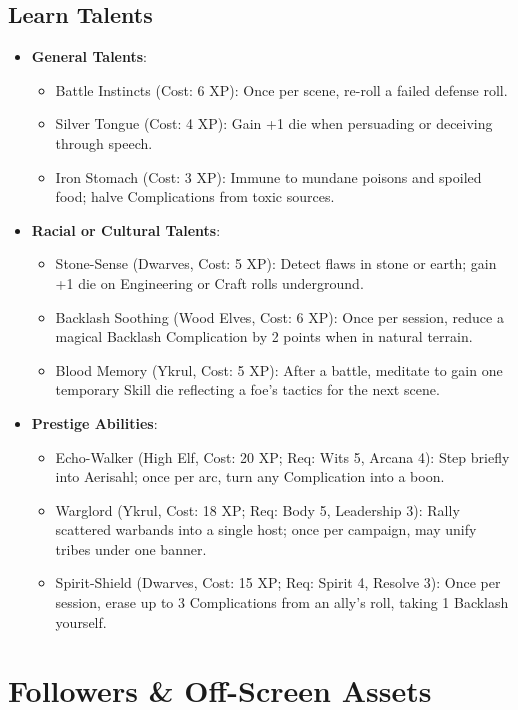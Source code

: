 \documentclass[11pt]{article}
\begin{document}
\subsection{Learn Talents}
\begin{itemize}
    \item \textbf{General Talents}:
    \begin{itemize}
        \item Battle Instincts (Cost: 6 XP): Once per scene, re-roll a failed defense roll.
        \item Silver Tongue (Cost: 4 XP): Gain +1 die when persuading or deceiving through speech.
        \item Iron Stomach (Cost: 3 XP): Immune to mundane poisons and spoiled food; halve Complications from toxic sources.
    \end{itemize}
    \item \textbf{Racial or Cultural Talents}:
    \begin{itemize}
        \item Stone-Sense (Dwarves, Cost: 5 XP): Detect flaws in stone or earth; gain +1 die on Engineering or Craft rolls underground.
        \item Backlash Soothing (Wood Elves, Cost: 6 XP): Once per session, reduce a magical Backlash Complication by 2 points when in natural terrain.
        \item Blood Memory (Ykrul, Cost: 5 XP): After a battle, meditate to gain one temporary Skill die reflecting a foe's tactics for the next scene.
    \end{itemize}
    \item \textbf{Prestige Abilities}:
    \begin{itemize}
        \item Echo-Walker (High Elf, Cost: 20 XP; Req: Wits 5, Arcana 4): Step briefly into Aerisahl; once per arc, turn any Complication into a boon.
        \item Warglord (Ykrul, Cost: 18 XP; Req: Body 5, Leadership 3): Rally scattered warbands into a single host; once per campaign, may unify tribes under one banner.
        \item Spirit-Shield (Dwarves, Cost: 15 XP; Req: Spirit 4, Resolve 3): Once per session, erase up to 3 Complications from an ally's roll, taking 1 Backlash yourself.
    \end{itemize}
\end{itemize}

\section{Followers \& Off-Screen Assets}
\end{document}

